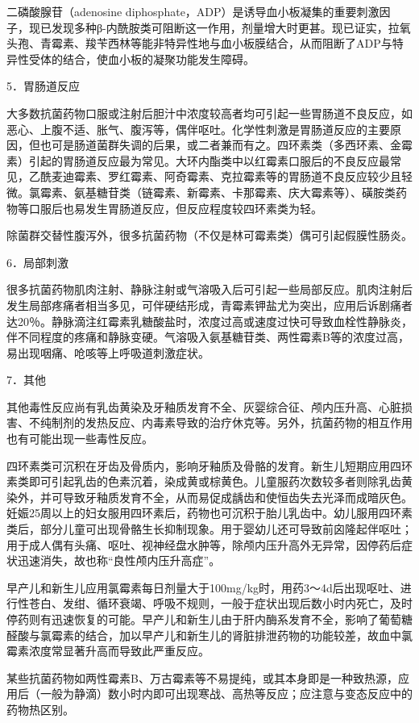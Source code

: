 二磷酸腺苷（adenosine
diphosphate，ADP）是诱导血小板凝集的重要刺激因子，现已发现多种β-内酰胺类可阻断这一作用，剂量增大时更甚。现已证实，拉氧头孢、青霉素、羧苄西林等能非特异性地与血小板膜结合，从而阻断了ADP与特异性受体的结合，使血小板的凝聚功能发生障碍。

5．胃肠道反应

大多数抗菌药物口服或注射后胆汁中浓度较高者均可引起一些胃肠道不良反应，如恶心、上腹不适、胀气、腹泻等，偶伴呕吐。化学性刺激是胃肠道反应的主要原因，但也可是肠道菌群失调的后果，或二者兼而有之。四环素类（多西环素、金霉素）引起的胃肠道反应最为常见。大环内酯类中以红霉素口服后的不良反应最常见，乙酰麦迪霉素、罗红霉素、阿奇霉素、克拉霉素等的胃肠道不良反应较少且轻微。氯霉素、氨基糖苷类（链霉素、新霉素、卡那霉素、庆大霉素等）、磺胺类药物等口服后也易发生胃肠道反应，但反应程度较四环素类为轻。

除菌群交替性腹泻外，很多抗菌药物（不仅是林可霉素类）偶可引起假膜性肠炎。

6．局部刺激

很多抗菌药物肌肉注射、静脉注射或气溶吸入后可引起一些局部反应。肌肉注射后发生局部疼痛者相当多见，可伴硬结形成，青霉素钾盐尤为突出，应用后诉剧痛者达20％。静脉滴注红霉素乳糖酸盐时，浓度过高或速度过快可导致血栓性静脉炎，伴不同程度的疼痛和静脉变硬。气溶吸入氨基糖苷类、两性霉素B等的浓度过高，易出现咽痛、呛咳等上呼吸道刺激症状。

7．其他

其他毒性反应尚有乳齿黄染及牙釉质发育不全、灰婴综合征、颅内压升高、心脏损害、不纯制剂的发热反应、内毒素导致的治疗休克等。另外，抗菌药物的相互作用也有可能出现一些毒性反应。

四环素类可沉积在牙齿及骨质内，影响牙釉质及骨骼的发育。新生儿短期应用四环素类即可引起乳齿的色素沉着，染成黄或棕黄色。儿童服药次数较多者则除乳齿黄染外，并可导致牙釉质发育不全，从而易促成龋齿和使恒齿失去光泽而成暗灰色。妊娠25周以上的妇女服用四环素后，药物也可沉积于胎儿乳齿中。幼儿服用四环素类后，部分儿童可出现骨骼生长抑制现象。用于婴幼儿还可导致前囟隆起伴呕吐；用于成人偶有头痛、呕吐、视神经盘水肿等，除颅内压升高外无异常，因停药后症状迅速消失，故也称“良性颅内压升高症”。

早产儿和新生儿应用氯霉素每日剂量大于100mg/kg时，用药3～4d后出现呕吐、进行性苍白、发绀、循环衰竭、呼吸不规则，一般于症状出现后数小时内死亡，及时停药则有迅速恢复的可能。早产儿和新生儿由于肝内酶系发育不全，影响了葡萄糖醛酸与氯霉素的结合，加以早产儿和新生儿的肾脏排泄药物的功能较差，故血中氯霉素浓度常显著升高而导致此严重反应。

某些抗菌药物如两性霉素B、万古霉素等不易提纯，或其本身即是一种致热源，应用后（一般为静滴）数小时内即可出现寒战、高热等反应；应注意与变态反应中的药物热区别。

